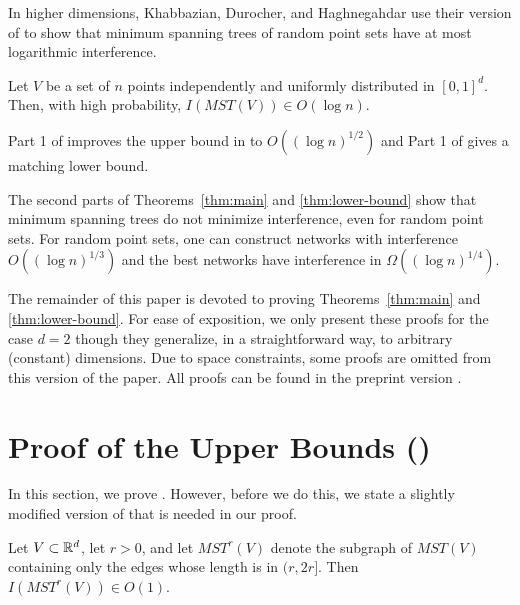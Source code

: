 \documentclass{cccg12}
\newcommand{\mst}{\mathit{MST}}
\begin{document}
In higher dimensions, Khabbazian, Durocher, and Haghnegahdar \cite{kdh11}
use their version of  to show that minimum spanning trees
of random point sets have at most logarithmic interference.
\begin{thm}
  Let $V$ be a set of $n$ points independently and uniformly distributed
  in $[0,1]^d$.  Then, with high probability, $I(\mst(V))\in O(\log n)$.
\end{thm}
Part 1 of  improves the upper bound in  to
$O((\log n)^{1/2})$ and Part 1 of  gives a matching
lower bound.

The second parts of Theorems~\ref{thm:main} and \ref{thm:lower-bound}
show that minimum spanning trees do not minimize interference, even for
random point sets.  For random point sets, one can construct networks with
interference $O((\log n)^{1/3})$ and the best networks have interference
in $\Omega((\log n)^{1/4})$.

The remainder of this paper is devoted to proving Theorems~\ref{thm:main}
and \ref{thm:lower-bound}.  For ease of exposition, we only present these
proofs for the case $d=2$ though they generalize, in a straightforward
way, to arbitrary (constant) dimensions.  Due to space constraints,
some proofs are omitted from this version of the paper.  All proofs can
be found in the preprint version \cite{dm12}.

\section{Proof of the Upper Bounds ()}

In this section, we prove .  However, before we do this,
we state a slightly modified version of  that is needed in
our proof.

\begin{lem}
  Let $V\subset\mathbb{R}^d$, let $r>0$, and let $\mst^r(V)$ denote the subgraph
  of $\mst(V)$ containing only the edges whose length is in $(r,2r]$.
  Then $I(\mst^r(V))\in O(1)$.
\end{lem}
\end{document}
